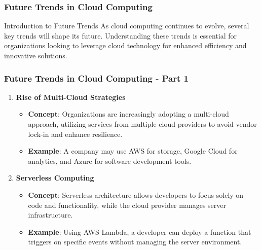\documentclass[aspectratio=169]{beamer}
\begin{document}
\begin{frame}[fragile]
    \frametitle{Future Trends in Cloud Computing}
    \begin{block}{Introduction to Future Trends}
        As cloud computing continues to evolve, several key trends will shape its future. Understanding these trends is essential for organizations looking to leverage cloud technology for enhanced efficiency and innovative solutions.
    \end{block}
\end{frame}

\begin{frame}[fragile]
    \frametitle{Future Trends in Cloud Computing - Part 1}
    \begin{enumerate}
        \item \textbf{Rise of Multi-Cloud Strategies}
        \begin{itemize}
            \item \textbf{Concept}: Organizations are increasingly adopting a multi-cloud approach, utilizing services from multiple cloud providers to avoid vendor lock-in and enhance resilience.
            \item \textbf{Example}: A company may use AWS for storage, Google Cloud for analytics, and Azure for software development tools.
        \end{itemize}

        \item \textbf{Serverless Computing}
        \begin{itemize}
            \item \textbf{Concept}: Serverless architecture allows developers to focus solely on code and functionality, while the cloud provider manages server infrastructure.
            \item \textbf{Example}: Using AWS Lambda, a developer can deploy a function that triggers on specific events without managing the server environment.
        \end{itemize}
    \end{enumerate}
\end{frame}
\end{document}
